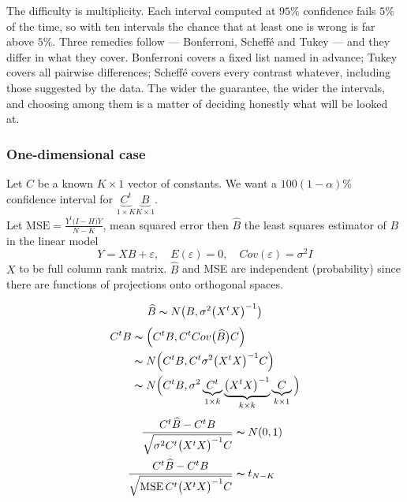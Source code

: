 \documentclass[11pt,a4paper]{article}
\theoremstyle{definition}
\begin{document}
The difficulty is multiplicity. Each interval computed at $95\%$ confidence
fails $5\%$ of the time, so with ten intervals the chance that at least one is
wrong is far above $5\%$. Three remedies follow --- Bonferroni, Scheff\'e and
Tukey --- and they differ in what they cover. Bonferroni covers a fixed list
named in advance; Tukey covers all pairwise differences; Scheff\'e covers every
contrast whatever, including those suggested by the data. The wider the
guarantee, the wider the intervals, and choosing among them is a matter of
deciding honestly what will be looked at.



\subsubsection*{One-dimensional case}
Let $C$ be a known $K\times 1$ vector of constants. We want a $100(1-\alpha)\%$ confidence interval for $\underbrace{C^t}_{1\times K}\underbrace{B}_{K\times 1}$.\\ Let $\text{MSE}=\frac{Y^t\big(I-H\big)Y}{N-K}$, mean squared error then $\hat{B}$ the least squares estimator of $B$ in the linear model $$Y=XB+\varepsilon,\quad  E(\varepsilon)=0,\quad  Cov(\varepsilon)=\sigma^2I$$
$X$ to be full column rank matrix. $\hat{B}$ and MSE are independent (probability) since there are functions of projections onto orthogonal spaces.\\


\begin{figure}[H]
\centering
{}
\end{figure}


$$\widehat{B}\thicksim N\big(B,\sigma^2\big(X^tX\big)^{-1}\big)$$
\begin{align*}
C^tB & \thicksim \Big(C^tB,C^tCov\big(\widehat{B}\big)C\Big)\\
     & \thicksim N\Big(C^tB, C^t\sigma^2\big(X^tX\big)^{-1}C\Big)\\
     & \thicksim N\Big(C^tB, \sigma^2\underbrace{C^t}_{1\times k}\underbrace{\big(X^tX\big)^{-1}}_{k \times k} \underbrace{C}_{k\times 1}\Big)
\end{align*}
\begin{align*}
\frac{C^t\widehat{B}-C^tB}{\sqrt{\sigma^2C^t\big(X^tX\big)^{-1}C}} & \thicksim N(0,1)\\
\frac{C^t\widehat{B}-C^tB}{\sqrt{\text{MSE}\, C^t\big(X^tX\big)^{-1}C}} & \thicksim t_{N-K}\\
\end{align*}
\end{document}
